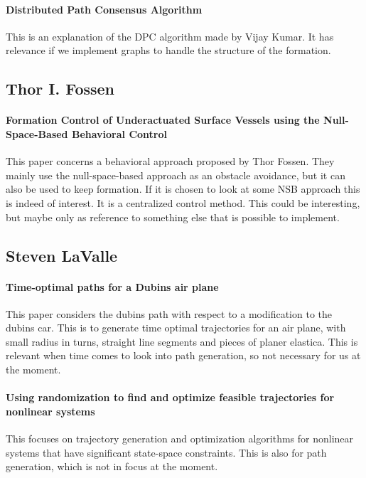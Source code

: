 \paragraph{Distributed Path Consensus Algorithm}
This is an explanation of the DPC algorithm made by Vijay Kumar. It has relevance if we implement graphs to handle the structure of the formation. \citep{bhattacharya2010distributed}

\subsection{Thor I. Fossen}

\paragraph{Formation Control of Underactuated Surface Vessels using the Null-Space-Based Behavioral Control}
This paper concerns a behavioral approach proposed by Thor Fossen. They mainly use the null-space-based approach as an obstacle avoidance, but it can also be used to keep formation. If it is chosen to look at some NSB approach this is indeed of interest. It is a centralized control method. This could be interesting, but maybe only as reference to something else that is possible to implement.

\subsection{Steven LaValle}

\paragraph{Time-optimal paths for a Dubins air plane}
This paper considers the dubins path with respect to a modification to the dubins car. This is to generate time optimal trajectories for an air plane, with small radius in turns, straight line segments and pieces of planer elastica.
This is relevant when time comes to look into path generation, so not necessary for us at the moment.

{\vskip0pt\color{gray}
\paragraph{Using randomization to find and optimize feasible trajectories for nonlinear systems}
This focuses on trajectory generation and optimization algorithms for nonlinear systems that have significant state-space constraints.
This is also for path generation, which is not in focus at the moment.}

